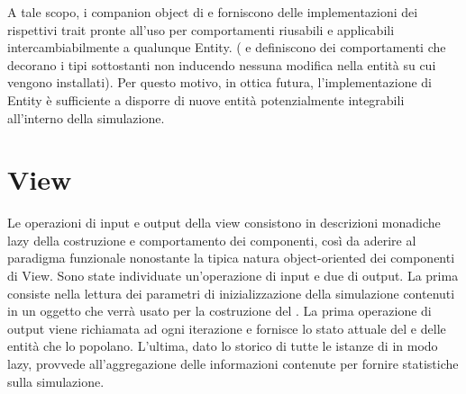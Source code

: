 A tale scopo, i companion object di  e  forniscono delle implementazioni dei rispettivi trait pronte all’uso per comportamenti riusabili e applicabili intercambiabilmente a qualunque Entity. ( e  definiscono dei comportamenti che decorano i tipi sottostanti non inducendo nessuna modifica nella entità su cui vengono installati). Per questo motivo, in ottica futura, l’implementazione di Entity è sufficiente a disporre di nuove entità potenzialmente integrabili all’interno della simulazione.

\section{View}

Le operazioni di input e output della view consistono in descrizioni monadiche lazy della costruzione e comportamento dei componenti, così da aderire al paradigma funzionale nonostante la tipica natura object-oriented dei componenti di View. Sono state individuate un'operazione di input e due di output. La prima consiste nella lettura dei parametri di inizializzazione della simulazione contenuti in un oggetto  che verrà usato per la costruzione del . La prima operazione di output viene richiamata ad ogni iterazione e fornisce lo stato attuale del  e delle entità che lo popolano. L'ultima, dato lo storico di tutte le istanze di  in modo lazy, provvede all'aggregazione delle informazioni contenute per fornire statistiche sulla simulazione.

